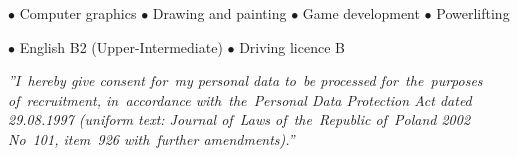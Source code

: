 \documentclass[11pt,a4paper]{article}
\begin{document}

    \bigskip


    \smallskip
    $\bullet$ Computer graphics
    \hspace{0.34cm}
    $\bullet$ Drawing and painting
    \hspace{0.34cm}
    $\bullet$ Game development
    \hspace{0.34cm}
    $\bullet$ Powerlifting


    \bigskip


    \smallskip
    $\bullet$ English B2 (Upper-Intermediate)
    \hspace{0.34cm}
    $\bullet$ Driving licence B


    \vspace{1cm}

    \noindent \textit{''I~hereby give consent for~my personal data to~be processed for~the~purposes of~recruitment,
    in~accordance with~the~Personal Data Protection Act dated 29.08.1997 (uniform text: Journal of~Laws of~the~Republic
    of~Poland 2002 No~101, item~926 with~further amendments).''}
\end{document}
